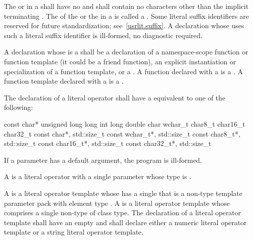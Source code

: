 \pnum
The  or 
in a  shall have no
 and shall contain no characters other than the
implicit terminating .
The  of the  or
the  in a  is called a
.
Some literal suffix identifiers are reserved for future standardization;
see~\ref{usrlit.suffix}.  A declaration whose  uses
such a literal suffix identifier is ill-formed, no diagnostic required.

\pnum
A declaration whose  is a
 shall be a declaration of a namespace-scope
function or function template (it could be a friend
function), an explicit instantiation or specialization of a
function template, or a .
A function declared with a  is a . A function template declared with a 
is a .

\pnum
The declaration of a literal operator shall have a
 equivalent to one of the following:

\begin{codeblock}
const char*
unsigned long long int
long double
char
wchar_t
char8_t
char16_t
char32_t
const char*, std::size_t
const wchar_t*, std::size_t
const char8_t*, std::size_t
const char16_t*, std::size_t
const char32_t*, std::size_t
\end{codeblock}

If a parameter has a default argument, the program is
ill-formed.

\pnum
A  is a literal operator with a single parameter
whose type is .

\pnum
A 
is a literal operator template whose 
has a single 
that is a non-type template parameter pack
with element type .
A 
is a literal operator template whose 
comprises
a single non-type  of class type.
The declaration of a literal operator template
shall have an empty 
and shall declare either a numeric literal operator template
or a string literal operator template.

